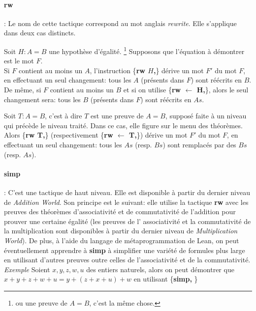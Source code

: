 \paragraph {\large\textbf{rw}}: Le nom de cette tactique correspond au mot anglais \textit{rewrite}. Elle s'applique dans deux cas distincts.

Soit $H : A = B$ une hypothèse d'égalité. \footnote{ou une preuve de $A = B$, c'est la même chose.}
Supposons que l'équation à démontrer est le mot $F$. \\Si $F$ contient au moins un $A$, l'instruction \big\{\textbf{rw $H$,}\big\} dérive un mot $F'$ du mot $F$, en effectuant un seul changement: tous les $A$ (présents dans $F$) sont réécrits en $B$. De même, si $F$ contient au moins un $B$ et si on utilise \big\{\textbf{rw $\leftarrow$ H,}\big\}, alors le seul changement sera: tous les $B$ (présents dans $F$) sont réécrits en $As$.

Soit $T: A=B$, c'est à dire $T$ est une preuve de $A=B$, supposé faite à un niveau qui précède le niveau traité. Dans ce cas, elle figure sur le menu des théorèmes. Alors \big\{\textbf{rw T,}\big\} (respectivement \big\{\textbf{rw $\leftarrow$ T,}\big\}) dérive un mot $F'$ du mot $F$, en effectuant un seul changement: tous les $As$ (resp. $Bs$) sont remplacés par des $Bs$ (resp. $As$). 

\paragraph {simp}: C'est une tactique de haut niveau. Elle est disponible à partir du dernier niveau de \textit{Addition World}. Son principe est le suivant: elle utilise la tactique \textbf{rw} avec les preuves des théorèmes d'associativité et de commutativité de l'addition pour prouver une certaine égalité (les preuves de l' associativité et la commutativité de la multiplication sont disponibles à partir du dernier niveau de \textit{Multiplication World}). De plus, à l'aide du langage de métaprogrammation de Lean, on peut éventuellement apprendre  à \textbf{simp} à simplifier une variété de formules plus large en utilisant d'autres preuves outre celles de l'associativité et de la commutativité.   \\
\textit{Exemple} Soient $x,y,z,w,u$ des entiers naturels, alors on peut démontrer que $x+y+z+w+u=y+(z+x+u)+w$ en utilisant \big\{\textbf{simp,} \big\}


